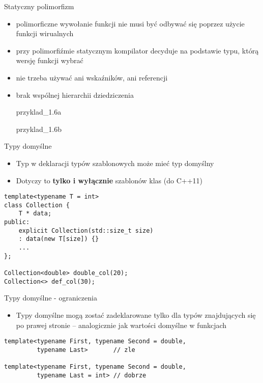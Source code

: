 \documentclass[11pt]{beamer}
\begin{document}
\begin{frame}[fragile]{Statyczny polimorfizm}
	\begin{itemize}
		\item polimorficzne wywołanie funkcji nie musi być odbywać się poprzez użycie funkcji wirualnych
		\item przy polimorfiźmie statycznym kompilator decyduje na podstawie typu, którą wersję funkcji wybrać
		\item nie trzeba używać ani wskaźników, ani referencji
		\item brak wspólnej hierarchii dziedziczenia
		
		\alert{przyklad\_1.6a}
		
		\alert{przyklad\_1.6b}
	\end{itemize}

\end{frame}

\begin{frame}[fragile]{Typy domyślne}
    \begin{itemize}
        \item Typ w deklaracji typów szablonowych może mieć typ domyślny 
        \item Dotyczy to \textbf{tylko i wyłącznie} szablonów klas (do C++11)
    \end{itemize}
    \begin{lstlisting}[frame=single]
template<typename T = int>
class Collection {
    T * data;
public:
    explicit Collection(std::size_t size)
    : data(new T[size]) {}
    ...
};

Collection<double> double_col(20);
Collection<> def_col(30);
    \end{lstlisting}
\end{frame}

\begin{frame}[fragile]{Typy domyślne - ograniczenia}
    \begin{itemize}
        \item Typy domyślne mogą zostać zadeklarowane tylko dla typów znajdujących się po prawej stronie -- analogicznie jak wartości domyślne w funkcjach
    \end{itemize}
    \begin{lstlisting}[frame=single]
template<typename First, typename Second = double,
         typename Last>       // zle

template<typename First, typename Second = double,
         typename Last = int> // dobrze
    \end{lstlisting}
\end{frame}
\end{document}
